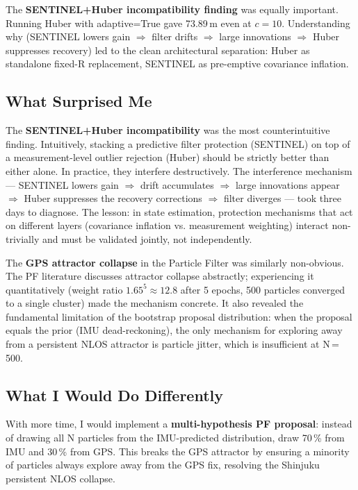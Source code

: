 \documentclass[12pt,a4paper]{article}
\begin{document}
The \textbf{SENTINEL+Huber incompatibility finding} was equally important.
Running Huber with adaptive=True gave 73.89\,m even at $c=10$.
Understanding why (SENTINEL lowers gain $\Rightarrow$ filter drifts $\Rightarrow$
large innovations $\Rightarrow$ Huber suppresses recovery) led to the clean
architectural separation: Huber as standalone fixed-R replacement, SENTINEL as
pre-emptive covariance inflation.

\subsection{What Surprised Me}

The \textbf{SENTINEL+Huber incompatibility} was the most counterintuitive finding.
Intuitively, stacking a predictive filter protection (SENTINEL) on top of a
measurement-level outlier rejection (Huber) should be strictly better than either alone.
In practice, they interfere destructively.
The interference mechanism --- SENTINEL lowers gain $\Rightarrow$ drift accumulates
$\Rightarrow$ large innovations appear $\Rightarrow$ Huber suppresses the recovery
corrections $\Rightarrow$ filter diverges --- took three days to diagnose.
The lesson: in state estimation, protection mechanisms that act on different layers
(covariance inflation vs. measurement weighting) interact non-trivially and must be
validated jointly, not independently.

The \textbf{GPS attractor collapse} in the Particle Filter was similarly non-obvious.
The PF literature discusses attractor collapse abstractly; experiencing it quantitatively
(weight ratio $1.65^5 \approx 12.8$ after 5 epochs, 500 particles converged to a
single cluster) made the mechanism concrete.
It also revealed the fundamental limitation of the bootstrap proposal distribution:
when the proposal equals the prior (IMU dead-reckoning), the only mechanism for
exploring away from a persistent NLOS attractor is particle jitter, which is
insufficient at N\,=\,500.

\subsection{What I Would Do Differently}

With more time, I would implement a \textbf{multi-hypothesis PF proposal}: instead of
drawing all N particles from the IMU-predicted distribution, draw 70\,\% from IMU and
30\,\% from GPS.
This breaks the GPS attractor by ensuring a minority of particles always explore away
from the GPS fix, resolving the Shinjuku persistent NLOS collapse.
\end{document}
